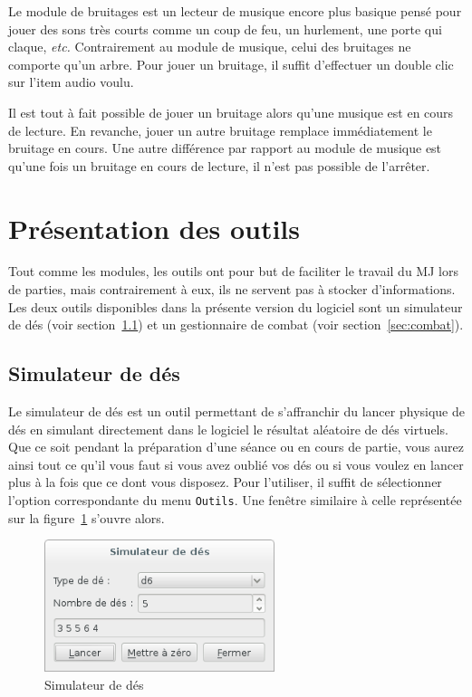 \documentclass[a4paper,12pt]{article}
\newcommand*{\interfaceitem}[1]{\texttt{#1}}
\begin{document}
Le module de bruitages est un lecteur de musique encore plus basique pensé pour jouer des sons très courts comme un coup de feu, un hurlement, une porte qui claque, \emph{etc.}
Contrairement au module de musique, celui des bruitages ne comporte qu'un arbre.
Pour jouer un bruitage, il suffit d'effectuer un double clic sur l'item audio voulu.

Il est tout à fait possible de jouer un bruitage alors qu'une musique est en cours de lecture.
En revanche, jouer un autre bruitage remplace immédiatement le bruitage en cours.
Une autre différence par rapport au module de musique est qu'une fois un bruitage en cours de lecture, il n'est pas possible de l'arrêter.

\section{Présentation des outils}
\label{sec:outils}

Tout comme les modules, les outils ont pour but de faciliter le travail du MJ lors de parties, mais contrairement à eux, ils ne servent pas à stocker d'informations.
Les deux outils disponibles dans la présente version du logiciel sont un simulateur de dés (voir section~\ref{sec:des}) et un gestionnaire de combat (voir section~\ref{sec:combat}).

\subsection{Simulateur de dés}
\label{sec:des}

Le simulateur de dés est un outil permettant de s'affranchir du lancer physique de dés en simulant directement dans le logiciel le résultat aléatoire de dés virtuels.
Que ce soit pendant la préparation d'une séance ou en cours de partie, vous aurez ainsi tout ce qu'il vous faut si vous avez oublié vos dés ou si vous voulez en lancer plus à la fois que ce dont vous disposez.
Pour l'utiliser, il suffit de sélectionner l'option correspondante du menu \interfaceitem{Outils}.
Une fenêtre similaire à celle représentée sur la figure~\ref{simulateur_des} s'ouvre alors.
\begin{figure}[ht]
    \centerline{\includegraphics[width=0.6\textwidth]{simulateur_de_des}}
    \caption{Simulateur de dés}
    \label{simulateur_des}
\end{figure}
\end{document}
